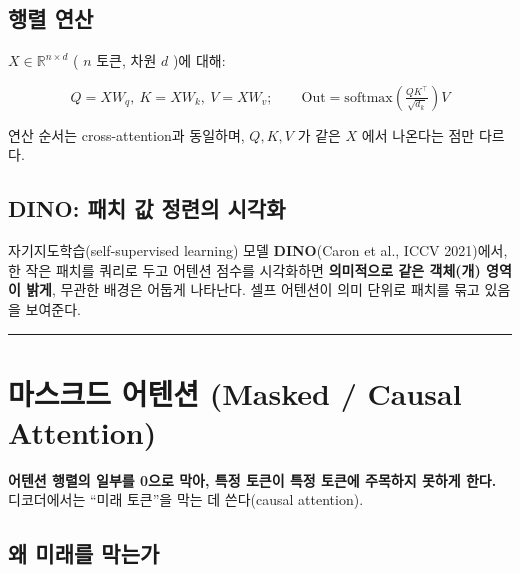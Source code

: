 \documentclass[
  korean,
]{article}
\begin{document}
\subsection{행렬 연산}\label{uxd589uxb82c-uxc5f0uxc0b0}

\(X \in \mathbb{R}^{n\times d}\) ( \(n\) 토큰, 차원 \(d\) )에 대해:

\[
Q=XW_q,\ K=XW_k,\ V=XW_v;\qquad
\text{Out} = \mathrm{softmax}\!\left(\tfrac{QK^\top}{\sqrt{d_k}}\right)V
\]

연산 순서는 cross-attention과 동일하며, \(Q,K,V\) 가 같은 \(X\) 에서
나온다는 점만 다르다.

\subsection{DINO: 패치 값 정련의
시각화}\label{dino-uxd328uxce58-uxac12-uxc815uxb828uxc758-uxc2dcuxac01uxd654}

자기지도학습(self-supervised learning) 모델 \textbf{DINO}(Caron et al.,
ICCV 2021)에서, 한 작은 패치를 쿼리로 두고 어텐션 점수를 시각화하면
\textbf{의미적으로 같은 객체(개) 영역이 밝게}, 무관한 배경은 어둡게
나타난다. 셀프 어텐션이 의미 단위로 패치를 묶고 있음을 보여준다.

\begin{center}\rule{0.5\linewidth}{0.5pt}\end{center}

\section{마스크드 어텐션 (Masked / Causal Attention)}\label{sec-mask}

\begin{tcolorbox}[enhanced jigsaw, arc=.35mm, bottomrule=.15mm, bottomtitle=1mm, breakable, colback=white, colbacktitle=quarto-callout-tip-color!10!white, colframe=quarto-callout-tip-color-frame, coltitle=black, left=2mm, leftrule=.75mm, opacityback=0, opacitybacktitle=0.6, rightrule=.15mm, title=\textcolor{quarto-callout-tip-color}{\faLightbulb}\hspace{0.5em}{핵심 한 줄}, titlerule=0mm, toprule=.15mm, toptitle=1mm]

\textbf{어텐션 행렬의 일부를 0으로 막아, 특정 토큰이 특정 토큰에
주목하지 못하게 한다.} 디코더에서는 ``미래 토큰''을 막는 데 쓴다(causal
attention).

\end{tcolorbox}

\subsection{왜 미래를
막는가}\label{uxc65c-uxbbf8uxb798uxb97c-uxb9c9uxb294uxac00}
\end{document}

